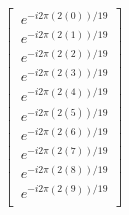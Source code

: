 \documentclass[preview]{standalone}
\begin{document}
\begin{align*}
\left[\begin{array}{l}\
            e^{-i 2 \pi(2(0)) / 19  }\\\
            e^{-i 2 \pi(2(1)) / 19  }\\\
            e^{-i 2 \pi(2(2)) / 19  }\\\
            e^{-i 2 \pi(2(3)) / 19  }\\\
            e^{-i 2 \pi(2(4)) / 19  }\\\
            e^{-i 2 \pi(2(5)) / 19  }\\\
            e^{-i 2 \pi(2(6)) / 19  }\\\
            e^{-i 2 \pi(2(7)) / 19  }\\\
            e^{-i 2 \pi(2(8)) / 19  }\\\
            e^{-i 2 \pi(2(9)) / 19  }\\\
            \end{array}\right]
\end{align*}
\end{document}
